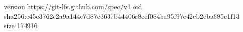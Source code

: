 version https://git-lfs.github.com/spec/v1
oid sha256:c45e3762e2a9a144e7d87c3637b44406c8cef084ba95f97e42cb2cba885c1f13
size 174916
